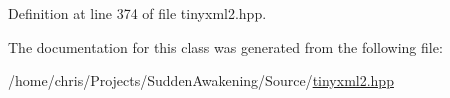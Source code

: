 Definition at line 374 of file tinyxml2.\-hpp.



The documentation for this class was generated from the following file\-:\begin{DoxyCompactItemize}
\item 
/home/chris/\-Projects/\-Sudden\-Awakening/\-Source/\hyperlink{tinyxml2_8hpp}{tinyxml2.\-hpp}\end{DoxyCompactItemize}

